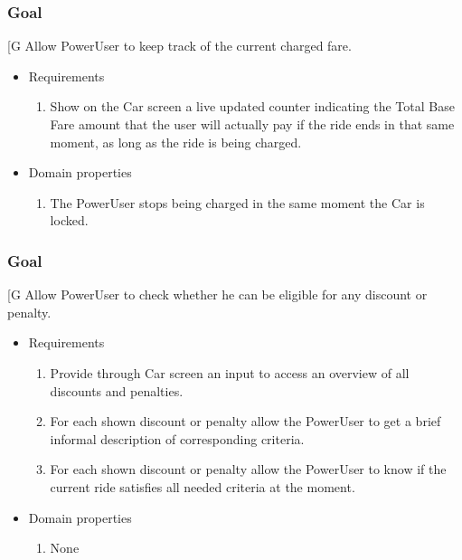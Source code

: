     \subsubsection{Goal }
    {[}G\arabic{goalctr}{]}
    Allow PowerUser to keep track of the current charged fare.
    \begin{itemize}
        \item Requirements
        \begin{enumerate}[REQ]
    			\item Show on the Car screen a live updated counter indicating the Total Base Fare amount that the user will actually pay if the ride ends in that same moment, as long as the ride is being charged.
        \end{enumerate}
        \item Domain properties
        \begin{enumerate}[PRO]
    			\item The PowerUser stops being charged in the same moment the Car is locked.
        \end{enumerate}
    \end{itemize}
    
    \subsubsection{Goal }
    {[}G\arabic{goalctr}{]}
    Allow PowerUser to check whether he can be eligible for any discount or penalty.
    \begin{itemize}
        \item Requirements
        \begin{enumerate}[REQ]
    			\item Provide through Car screen an input to access an overview of all discounts and penalties.
    			\item For each shown discount or penalty allow the PowerUser to get a brief informal description of corresponding criteria.
    			\item For each shown discount or penalty allow the PowerUser to know if the current ride satisfies all needed criteria at the moment.
        \end{enumerate}
        \item Domain properties
        \begin{enumerate}[PRO]
    			\item None
        \end{enumerate}
    \end{itemize}
 

